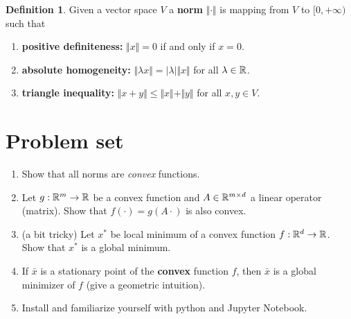 \documentclass{scrartcl}
\theoremstyle{definition}
\newtheorem{definition}{Definition}[section]
\begin{document}
\begin{definition}
  Given a vector space $V$ a \textbf{norm} $\Vert \cdot \Vert$ is mapping from $V$ to $[0, +\infty)$ such that
  \begin{enumerate}
    \item \textbf{positive definiteness:} $\Vert x \Vert = 0$ if and only if $x=0$.
    \item \textbf{absolute homogeneity:} $\Vert \lambda x \Vert = \vert \lambda \vert \Vert x \Vert$ for all $\lambda \in \mathbb{R}$.
      \item \textbf{triangle inequality:} $\Vert x+y \Vert \le \Vert x \Vert + \Vert y \Vert$ for all $x,y \in V$.
  \end{enumerate}
\end{definition}

\section{Problem set}%

\begin{enumerate}
  \item Show that all norms are \emph{convex} functions.
  \item Let $g: \mathbb{R}^m \to \mathbb{R}$ be a convex function and $A \in \mathbb{R}^{m \times d}$ a linear operator (matrix). Show that $f(\cdot) = g(A \cdot)$ is also convex.
  \item (a bit tricky) Let $x^*$ be local minimum of a convex function $f:\mathbb{R}^d\to \mathbb{R}$. Show that $x^*$ is a global minimum.
  \item If $\bar{x}$ is a stationary point of the \textbf{convex} function $f$, then $\bar{x}$ is a global minimizer of $f$ (give a geometric intuition).
  \item Install and familiarize yourself with python and Jupyter Notebook.
\end{enumerate}
\end{document}
